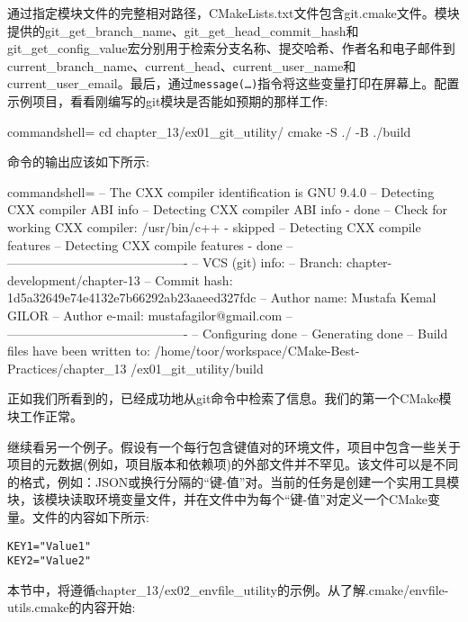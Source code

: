 通过指定模块文件的完整相对路径，CMakeLists.txt文件包含git.cmake文件。模块提供的git\_get\_branch\_name、git\_get\_head\_commit\_hash和git\_get\_config\_value宏分别用于检索分支名称、提交哈希、作者名和电子邮件到current\_branch\_name、current\_head、current\_user\_name和current\_user\_email。最后，通过\texttt{message(…)}指令将这些变量打印在屏幕上。配置示例项目，看看刚编写的git模块是否能如预期的那样工作:

\begin{tcblisting}{commandshell={}}
cd chapter_13/ex01_git_utility/
cmake -S ./ -B ./build
\end{tcblisting}

命令的输出应该如下所示:

\begin{tcblisting}{commandshell={}}
-- The CXX compiler identification is GNU 9.4.0
-- Detecting CXX compiler ABI info
-- Detecting CXX compiler ABI info - done
-- Check for working CXX compiler: /usr/bin/c++ - skipped
-- Detecting CXX compile features
-- Detecting CXX compile features - done
-- -------------------------------------------
-- VCS (git) info:
-- Branch: chapter-development/chapter-13
-- Commit hash: 1d5a32649e74e4132e7b66292ab23aaeed327fdc
-- Author name: Mustafa Kemal GILOR
-- Author e-mail: mustafagilor@gmail.com
-- -------------------------------------------
-- Configuring done
-- Generating done
-- Build files have been written to:
/home/toor/workspace/CMake-Best-Practices/chapter_13
/ex01_git_utility/build
\end{tcblisting}

正如我们所看到的，已经成功地从git命令中检索了信息。我们的第一个CMake模块工作正常。


继续看另一个例子。假设有一个每行包含键值对的环境文件，项目中包含一些关于项目的元数据(例如，项目版本和依赖项)的外部文件并不罕见。该文件可以是不同的格式，例如：JSON或换行分隔的“键-值”对。当前的任务是创建一个实用工具模块，该模块读取环境变量文件，并在文件中为每个“键-值”对定义一个CMake变量。文件的内容如下所示:

\begin{lstlisting}[style=styleCMake]
KEY1="Value1"
KEY2="Value2"
\end{lstlisting}

本节中，将遵循chapter\_13/ex02\_envfile\_utility的示例。从了解.cmake/envfile-utils.cmake的内容开始:


